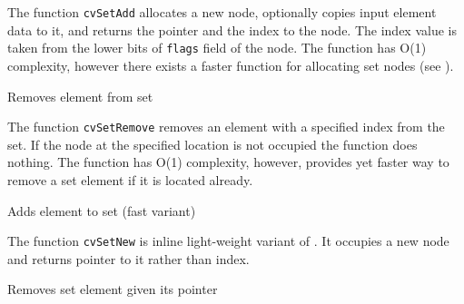 The function \texttt{cvSetAdd} allocates a new node, optionally copies
input element data to it, and returns the pointer and the index to the
node. The index value is taken from the lower bits of \texttt{flags}
field of the node. The function has O(1) complexity, however there exists
a faster function for allocating set nodes (see ).

\label{SetRemove}

Removes element from set


\begin{description}
\end{description}

The function \texttt{cvSetRemove} removes an element with a specified
index from the set. If the node at the specified location is not occupied
the function does nothing. The function has O(1) complexity, however,
 provides yet faster way to remove a set element
if it is located already.

\label{SetNew}

Adds element to set (fast variant)


\begin{description}
\end{description}


The function \texttt{cvSetNew} is inline light-weight variant of . It occupies a new node and returns pointer to it rather than index.


\label{SetRemoveByPtr}

Removes set element given its pointer


\begin{description}
\end{description}

